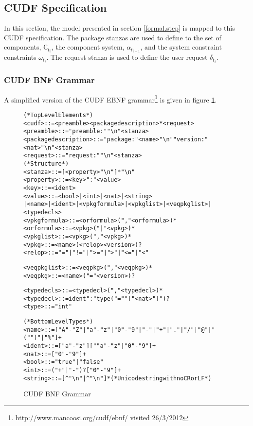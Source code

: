 \subsection{CUDF Specification}
In this section, the model presented in section \ref{formal.step} is mapped to this CUDF specification.
The package stanzas are used to define to the set of components, $\mathbb{C}_{t_i}$, the component system, $\alpha_{t_{i-1}}$, and the system constraint constraints $\omega_{t_i}$. 
The request stanza is used to define the user request $\delta_{t_i}$. 

\subsubsection{CUDF BNF Grammar}
A simplified version of the CUDF EBNF grammar\footnote{http://www.mancoosi.org/cudf/ebnf/ visited 26/3/2012} is given in figure \ref{formal.cudfBNFgrammar}. 

\begin{figure}[htp] 
\begin{center}
\begin{alltt}
(* Top Level Elements *)
<cudf> ::= <preamble> <packagedescription>* <request>
<preamble> ::= "preamble:" "\textbackslash{}n" <stanza>
<packagedescription> ::= "package:" <name> "\textbackslash{}n" "version:" <nat> "\textbackslash{}n" <stanza>
<request> ::= "request:" "\textbackslash{}n" <stanza>
(* Structure *)
<stanza> ::= [<property> "\textbackslash{}n"]* "\textbackslash{}n"
<property> ::= <key> ":" <value>
<key> ::= <ident>
<value> ::= <bool> | <int> | <nat> | <string> \\| <name> | <ident> | <vpkgformula> | <vpkglist> | <veqpkglist> | <typedecls>
<vpkgformula> ::= <orformula> ("," <orformula>)*
<orformula> ::= <vpkg> ("|" <vpkg>)*
<vpkglist> ::= <vpkg> ("," <vpkg>)*
<vpkg> ::= <name> (<relop> <version>)?
<relop> ::= "=" | "!=" | ">=" | ">" | "<=" | "<"

<veqpkglist> ::= <veqpkg> ("," <veqpkg>)*
<veqpkg> ::= <name> ("=" <version>)?

<typedecls> ::= <typedecl> ("," <typedecl>)*
<typedecl> ::= ident ":" type ("=" "["<nat>"]")?
<type> ::= "int"

(* Bottom Level Types *)
<name> ::= ["A"-"Z" | "a"-"z" | "0"-"9" | "-" | "+" | "." | "/" | "@" | "(" ")" | "\%"]+
<ident> ::= ["a"-"z"][""a"-"z" | "0"-"9"]+		
<nat> ::= ["0"-"9"]+
<bool> ::= "true" | "false"
<int> ::= ("+"|"-")? ["0"-"9"]+
<string> ::= [^"\textbackslash{}n"| ^"\textbackslash{}n"]* (*Unicode string with no CR or LF*)
\end{alltt}
  \caption{CUDF BNF Grammar}
  \label{formal.cudfBNFgrammar}
\end{center}
\end{figure}

